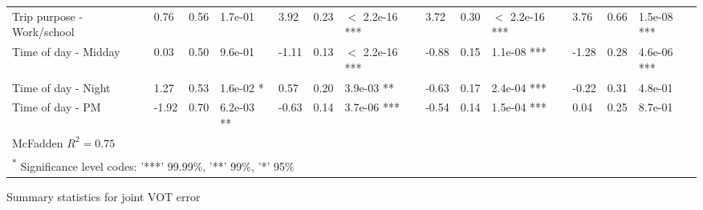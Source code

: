 \documentclass{article}\usepackage[utf8]{inputenc}
\begin{document}
\begin{table}[H]
\begin{tabular}{lllllllllllll}
Trip purpose - Work/school & 0.76 & 0.56 & 1.7e-01 & 3.92 & 0.23 & $<$ 2.2e-16 *** & 3.72 & 0.30 & $<$ 2.2e-16 *** & 3.76 & 0.66 & 1.5e-08 ***\\
Time of day - Midday & 0.03 & 0.50 & 9.6e-01 & -1.11 & 0.13 & $<$ 2.2e-16 *** & -0.88 & 0.15 & 1.1e-08 *** & -1.28 & 0.28 & 4.6e-06 ***\\
Time of day - Night & 1.27 & 0.53 & 1.6e-02 * & 0.57 & 0.20 & 3.9e-03 ** & -0.63 & 0.17 & 2.4e-04 *** & -0.22 & 0.31 & 4.8e-01\\
Time of day - PM & -1.92 & 0.70 & 6.2e-03 ** & -0.63 & 0.14 & 3.7e-06 *** & -0.54 & 0.14 & 1.5e-04 *** & 0.04 & 0.25 & 8.7e-01\\
\bottomrule
\multicolumn{13}{l}{\rule{0pt}{1em}McFadden $R^2=0.75$}\\
\multicolumn{13}{l}{\rule{0pt}{1em}\textsuperscript{*} Significance level codes: '***' 99.99\%, '**' 99\%, '*' 95\%}\\
\end{tabular}
\endgroup{} \end{table} \begin{table}[H]\centering\setlength{\tabcolsep}{4pt}\caption{Summary statistics for joint VOT error} \begingroup\fontsize{8}{10}\selectfont


\end{table}
\end{document}
